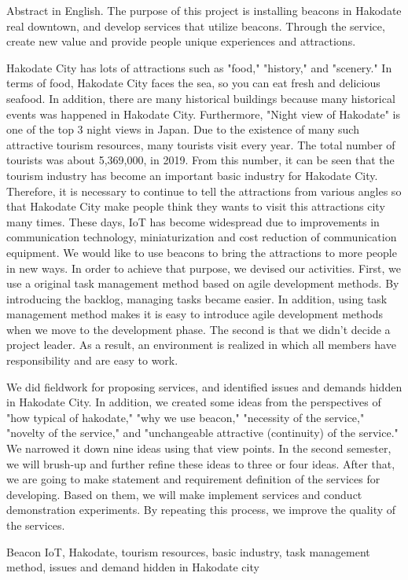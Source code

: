 \begin{eabstract} Abstract in English. 
The purpose of this project is installing beacons in Hakodate real downtown, and develop services that utilize beacons. Through the service, create new value and provide people unique experiences and attractions.

Hakodate City has lots of attractions such as "food," "history," and "scenery."
In terms of food, Hakodate City faces the sea, so you can eat fresh and delicious seafood.
In addition, there are many historical buildings because many historical events was happened in Hakodate City.
Furthermore, "Night view of Hakodate" is one of the top 3 night views in Japan.
Due to the existence of many such attractive tourism resources, many tourists visit every year.
The total number of tourists was about 5,369,000, in 2019.
From this number, it can be seen that the tourism industry has become an important basic industry for Hakodate City.
Therefore, it is necessary to continue to tell the attractions from various angles so that Hakodate City make people think they wants to visit this attractions city many times.
These days, IoT has become widespread due to improvements in communication technology, miniaturization and cost reduction of communication equipment.
We would like to use beacons to bring the attractions to more people in new ways.
In order to achieve that purpose, we devised our activities.
First, we use a original task management method based on agile development methods.
By introducing the backlog, managing tasks became easier.
In addition, using task management method makes it is easy to introduce agile development methods when we move to the development phase.
The second is that we didn't decide a project leader.
As a result, an environment is realized in which all members have responsibility and are easy to work.

We did fieldwork for proposing services, and identified issues and demands hidden in Hakodate City.
In addition, we created some ideas from the perspectives of "how typical of hakodate," "why we use beacon," "necessity of the service," "novelty of the service," and "unchangeable attractive (continuity) of the service."
We narrowed it down nine ideas using that view points.
In the second semester, we will brush-up and further refine these ideas to three or four ideas.
After that, we are going to make statement and requirement definition of the services for developing.
Based on them, we will make implement services and conduct demonstration experiments.
By repeating this process, we improve the quality of the services. 
\begin{ekeyword}
Beacon IoT, Hakodate, tourism resources, basic industry, task management method, issues and demand hidden in Hakodate city
\end{ekeyword}
\end{eabstract}
